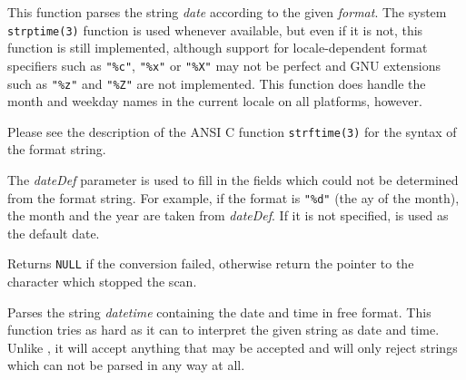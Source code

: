 \label{wxdatetimeparseformat}




This function parses the string {\it date} according to the given
{\it format}. The system {\tt strptime(3)} function is used whenever available,
but even if it is not, this function is still implemented, although support
for locale-dependent format specifiers such as {\tt "\%c"}, {\tt "\%x"} or {\tt "\%X"} may
not be perfect and GNU extensions such as {\tt "\%z"} and {\tt "\%Z"} are
not implemented. This function does handle the month and weekday
names in the current locale on all platforms, however.

Please see the description of the ANSI C function {\tt strftime(3)} for the syntax
of the format string.

The {\it dateDef} parameter is used to fill in the fields which could not be
determined from the format string. For example, if the format is {\tt "\%d"} (the
ay of the month), the month and the year are taken from {\it dateDef}. If
it is not specified,  is used as the
default date.

Returns {\tt NULL} if the conversion failed, otherwise return the pointer to
the character which stopped the scan.


\label{wxdatetimeparsedatetime}




Parses the string {\it datetime} containing the date and time in free format.
This function tries as hard as it can to interpret the given string as date
and time. Unlike , it
will accept anything that may be accepted and will only reject strings which
can not be parsed in any way at all.

